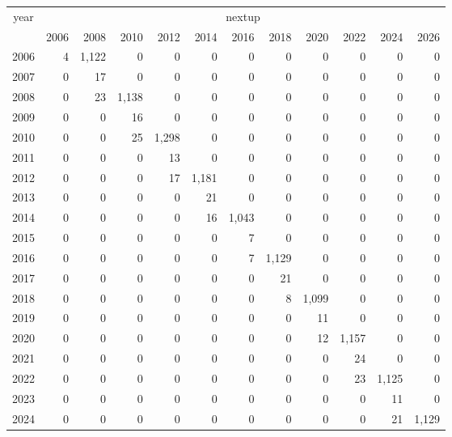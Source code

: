 \footnotesize\begin{tabular}[t]{lrrrrrrrrrrr}
\toprule
\multicolumn{1}{c}{year} & \multicolumn{11}{c}{nextup} \\
\cmidrule(l{3pt}r{3pt}){1-1} \cmidrule(l{3pt}r{3pt}){2-12}
  & 2006 & 2008 & 2010 & 2012 & 2014 & 2016 & 2018 & 2020 & 2022 & 2024 & 2026\\
\midrule
2006 & 4 & 1,122 & 0 & 0 & 0 & 0 & 0 & 0 & 0 & 0 & 0\\
2007 & 0 & 17 & 0 & 0 & 0 & 0 & 0 & 0 & 0 & 0 & 0\\
2008 & 0 & 23 & 1,138 & 0 & 0 & 0 & 0 & 0 & 0 & 0 & 0\\
2009 & 0 & 0 & 16 & 0 & 0 & 0 & 0 & 0 & 0 & 0 & 0\\
2010 & 0 & 0 & 25 & 1,298 & 0 & 0 & 0 & 0 & 0 & 0 & 0\\
2011 & 0 & 0 & 0 & 13 & 0 & 0 & 0 & 0 & 0 & 0 & 0\\
2012 & 0 & 0 & 0 & 17 & 1,181 & 0 & 0 & 0 & 0 & 0 & 0\\
2013 & 0 & 0 & 0 & 0 & 21 & 0 & 0 & 0 & 0 & 0 & 0\\
2014 & 0 & 0 & 0 & 0 & 16 & 1,043 & 0 & 0 & 0 & 0 & 0\\
2015 & 0 & 0 & 0 & 0 & 0 & 7 & 0 & 0 & 0 & 0 & 0\\
2016 & 0 & 0 & 0 & 0 & 0 & 7 & 1,129 & 0 & 0 & 0 & 0\\
2017 & 0 & 0 & 0 & 0 & 0 & 0 & 21 & 0 & 0 & 0 & 0\\
2018 & 0 & 0 & 0 & 0 & 0 & 0 & 8 & 1,099 & 0 & 0 & 0\\
2019 & 0 & 0 & 0 & 0 & 0 & 0 & 0 & 11 & 0 & 0 & 0\\
2020 & 0 & 0 & 0 & 0 & 0 & 0 & 0 & 12 & 1,157 & 0 & 0\\
2021 & 0 & 0 & 0 & 0 & 0 & 0 & 0 & 0 & 24 & 0 & 0\\
2022 & 0 & 0 & 0 & 0 & 0 & 0 & 0 & 0 & 23 & 1,125 & 0\\
2023 & 0 & 0 & 0 & 0 & 0 & 0 & 0 & 0 & 0 & 11 & 0\\
2024 & 0 & 0 & 0 & 0 & 0 & 0 & 0 & 0 & 0 & 21 & 1,129\\
\bottomrule
\end{tabular}
